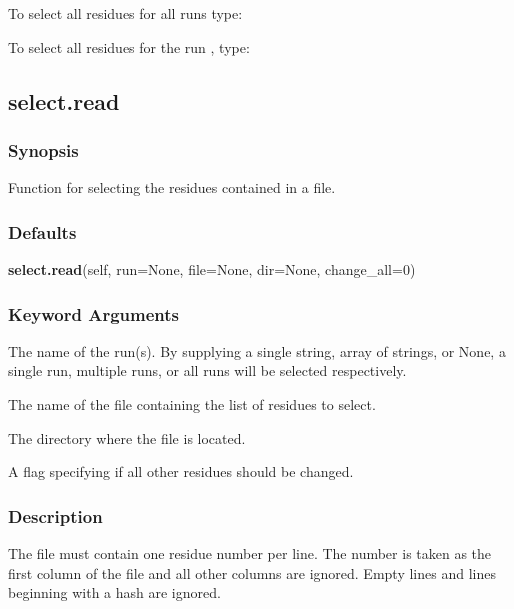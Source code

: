 To select all residues for all runs type:




To select all residues for the run 
, type:





\newpage

\subsection{select.read}


\subsubsection{Synopsis}

Function for selecting the residues contained in a file.

\subsubsection{Defaults}

\textsf{\textbf{select.read}(self, run=None, file=None, dir=None, change\_all=0)}


\subsubsection{Keyword Arguments}


  The name of the run(s).  By supplying a single string, array of strings, or None, a single run, multiple runs, or all runs will be selected respectively.

  The name of the file containing the list of residues to select.

  The directory where the file is located.

  A flag specifying if all other residues should be changed.

\subsubsection{Description}

The file must contain one residue number per line.  The number is taken as the first column
of the file and all other columns are ignored.  Empty lines and lines beginning with a hash
are ignored.


